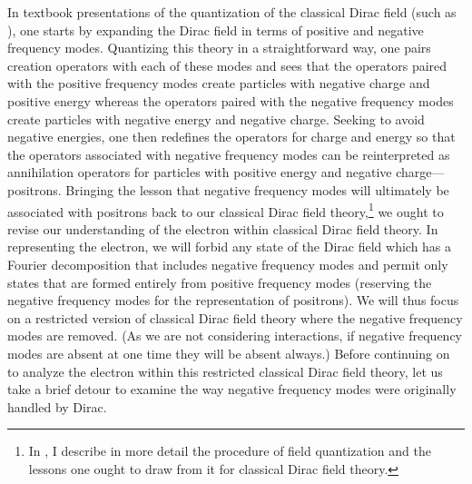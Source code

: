 \documentclass[12pt,secnumarabic,amsmath,amssymb,balancelastpage,nofootinbib]{article}
\begin{document}
In textbook presentations of the quantization of the classical Dirac field (such as \citealp[section 3.5]{peskinschroeder}), one starts by expanding the Dirac field in terms of positive and negative frequency modes.  Quantizing this theory in a straightforward way, one pairs creation operators with each of these modes and sees that the operators paired with the positive frequency modes create particles with negative charge and positive energy whereas the operators paired with the negative frequency modes create particles with negative energy and negative charge.  Seeking to avoid negative energies, one then redefines the operators for charge and energy so that the operators associated with negative frequency modes can be reinterpreted as annihilation operators for particles with positive energy and negative charge---positrons.  Bringing the lesson that negative frequency modes will ultimately be associated with positrons back to our classical Dirac field theory,\footnote{In \citet{positronpaper}, I describe in more detail the procedure of field quantization and the lessons one ought to draw from it for classical Dirac field theory.} we ought to revise our understanding of the electron within classical Dirac field theory.  In representing the electron, we will forbid any state of the Dirac field which has a Fourier decomposition that includes negative frequency modes and permit only states that are formed entirely from positive frequency modes (reserving the negative frequency modes for the representation of positrons).  We will thus focus on a restricted version of classical Dirac field theory where the negative frequency modes are removed.  (As we are not considering interactions, if negative frequency modes are absent at one time they will be absent always.)  Before continuing on to analyze the electron within this restricted classical Dirac field theory, let us take a brief detour to examine the way negative frequency modes were originally handled by Dirac.
\end{document}
